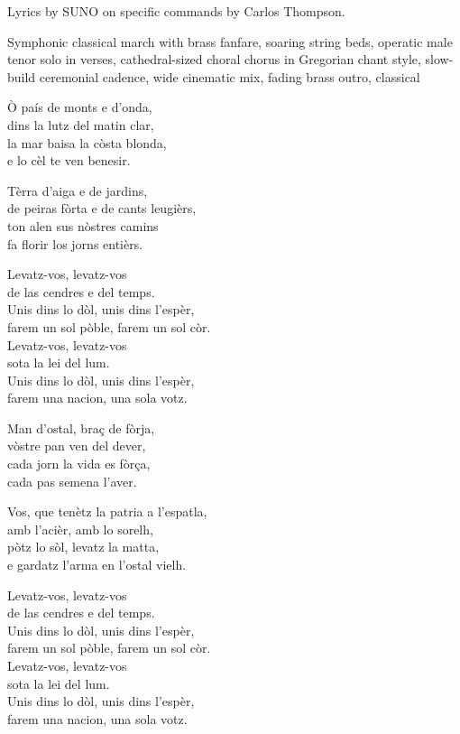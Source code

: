 
\begin{notes}
Lyrics by SUNO on specific commands by Carlos Thompson.
\end{notes}
\begin{style}
Symphonic classical march with brass fanfare, soaring string beds, operatic male tenor solo in verses, cathedral-sized choral chorus in Gregorian chant style, slow-build ceremonial cadence, wide cinematic mix, fading brass outro, classical
\end{style}
\begin{lyrics}

Ò país de monts e d’onda,\\
dins la lutz del matin clar,\\
la mar baisa la còsta blonda,\\
e lo cèl te ven benesir.

Tèrra d’aiga e de jardins,\\
de peiras fòrta e de cants leugièrs,\\
ton alen sus nòstres camins\\
fa florir los jorns entièrs.

Levatz-vos, levatz-vos\\
de las cendres e del temps.\\
Unis dins lo dòl, unis dins l’espèr,\\
farem un sol pòble, farem un sol còr.\\
Levatz-vos, levatz-vos\\
sota la lei del lum.\\
Unis dins lo dòl, unis dins l’espèr,\\
farem una nacion, una sola votz.

Man d’ostal, braç de fòrja,\\
vòstre pan ven del dever,\\
cada jorn la vida es fòrça,\\
cada pas semena l’aver.

Vos, que tenètz la patria a l’espatla,\\
amb l’acièr, amb lo sorelh,\\
pòtz lo sòl, levatz la matta,\\
e gardatz l’arma en l’ostal vielh.

Levatz-vos, levatz-vos\\
de las cendres e del temps.\\
Unis dins lo dòl, unis dins l’espèr,\\
farem un sol pòble, farem un sol còr.\\
Levatz-vos, levatz-vos\\
sota la lei del lum.\\
Unis dins lo dòl, unis dins l’espèr,\\
farem una nacion, una sola votz.


\end{lyrics}
